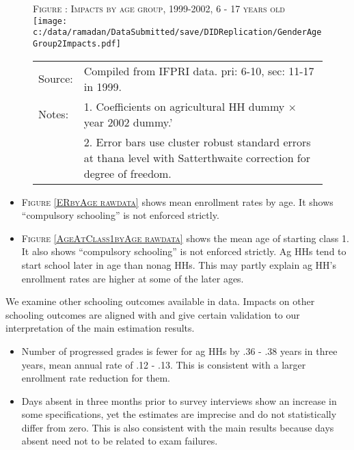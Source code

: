 \begin{figure}
\hfil\textsc{\footnotesize Figure \thefigure: Impacts by age group, 1999-2002, 6 - 17 years old\label{AgeGroup2.zEm.1999}}\\
\hfil \texttt{[image: c:/data/ramadan/DataSubmitted/save/DIDReplication/GenderAgeGroup2Impacts.pdf]}\\
\renewcommand{\arraystretch}{1}
\hfil\begin{tabular}{>{\hfill\scriptsize}p{1cm}<{}>{\scriptsize}p{12cm}<{\hfill}}
Source:& Compiled from IFPRI data. pri: 6-10, sec: 11-17  in 1999.\\[-1ex]
Notes:& 1. Coefficients on agricultural HH dummy $\times$ year 2002 dummy.'\\[-1ex]
& 2. Error bars use cluster robust standard errors at thana level with Satterthwaite correction for degree of freedom.
\end{tabular}
\end{figure}




\begin{itemize}
\vspace{1.0ex}\setlength{\itemsep}{1.0ex}\setlength{\baselineskip}{12pt}
\item	\textsc{\footnotesize Figure \ref{ERbyAge rawdata}} shows mean enrollment rates by age. It shows ``compulsory schooling'' is not enforced strictly. 
\item	\textsc{\footnotesize Figure \ref{AgeAtClass1byAge rawdata}} shows the mean age of starting class 1. It also shows ``compulsory schooling'' is not enforced strictly. Ag HHs tend to start school later in age than nonag HHs. This may partly explain ag HH's enrollment rates are higher at some of the later ages. 
\end{itemize}




We examine other schooling outcomes available in data. Impacts on other schooling outcomes are aligned with and give certain validation to our interpretation of the main estimation results. 
\begin{itemize}
\vspace{1.0ex}\setlength{\itemsep}{1.0ex}\setlength{\baselineskip}{12pt}
\item	Number of progressed grades is fewer for ag HHs by .36 - .38 years in three years, mean annual rate of .12 - .13. This is consistent with a larger enrollment rate reduction for them.
\item	Days absent in three months prior to survey interviews show an increase in some specifications, yet the estimates are imprecise and do not statistically differ from zero. This is also consistent with the main results because days absent need not to be related to exam failures. 
\end{itemize}



{\footnotesize
\setlength{\baselineskip}{8pt}

}


